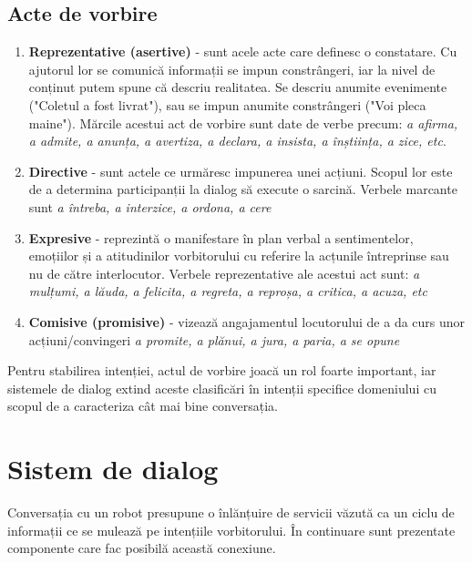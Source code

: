 \subsection{Acte de vorbire}
\begin{enumerate}
	\item \textbf{Reprezentative (asertive)} - sunt acele acte care definesc o constatare. Cu ajutorul lor se comunică informații se impun constrângeri, iar la nivel de conținut putem spune că descriu realitatea. Se descriu anumite evenimente ("Coletul a fost livrat"), sau se impun anumite constrângeri ("Voi pleca maine"). Mărcile acestui act de vorbire sunt date de verbe precum: \textit{a afirma, a admite, a anunța, a avertiza, a declara, a insista, a înștiința, a zice, etc}.

	\item \textbf{Directive} - sunt actele ce urmăresc impunerea unei acțiuni. Scopul lor este de a determina participanții la dialog să execute o sarcină. Verbele marcante sunt \textit{a întreba, a interzice, a ordona, a cere}
	
	\item \textbf{Expresive} -  reprezintă o manifestare în plan verbal a sentimentelor, emoțiilor și a atitudinilor vorbitorului cu referire la acțunile întreprinse sau nu de către interlocutor. Verbele reprezentative ale acestui act sunt: \textit{a mulțumi, a lăuda, a felicita, a regreta, a reproșa, a critica, a acuza, etc}
	
	\item \textbf{Comisive (promisive)} - vizează angajamentul locutorului de a da curs unor acțiuni/convingeri \textit{a promite, a plănui, a jura, a paria, a se opune}
\end{enumerate}

Pentru stabilirea intenției, actul de vorbire joacă un rol foarte important, iar sistemele de dialog extind aceste clasificări în intenții specifice domeniului cu scopul de a caracteriza cât mai bine conversația.

\section{Sistem de dialog}
Conversația cu un robot presupune o înlănțuire de servicii văzută ca un ciclu de informații ce se mulează pe intențiile vorbitorului. În continuare sunt prezentate componente care fac posibilă această conexiune.
